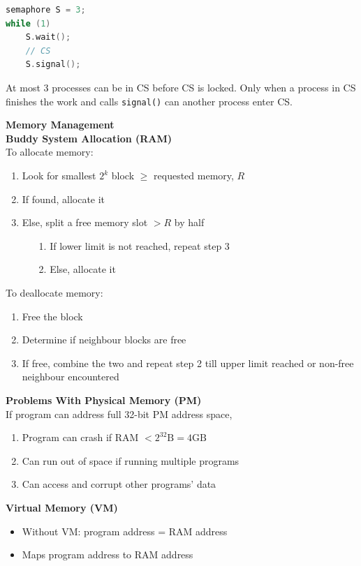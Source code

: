 \documentclass[a4paper, 12pt]{article}
\begin{document}
\begin{multicols*}{4}
\setlength{\columnsep}{-1.4cm}
\begin{multicols}{2}
\noindent
\begin{lstlisting}[language=C]
semaphore S = 3;
while (1)
    S.wait();
    // CS
    S.signal();
\end{lstlisting}
\vfill\null
\columnbreak
At most 3 processes can be in CS before CS is locked. Only when a process in CS finishes the work and calls \texttt{signal()} can another process enter CS.
\end{multicols}

{\small\textbf{Memory Management}} \\
\textbf{Buddy System Allocation (RAM)}\\
To allocate memory:
\begin{enumerate}
	\item Look for smallest $2^k$ block $\geq$ requested memory, $R$
	\item If found, allocate it
	\item Else, split a free memory slot $> R$ by half
	\begin{enumerate}
		\item[1.] If lower limit is not reached, repeat step 3
		\item[2.] Else, allocate it
	\end{enumerate}
\end{enumerate}
To deallocate memory:
\begin{enumerate}
	\item Free the block
	\item Determine if neighbour blocks are free
	\item If free, combine the two and repeat step 2 till upper limit reached or non-free neighbour encountered
\end{enumerate}
\textbf{Problems With Physical Memory (PM)} \\
If program can address full 32-bit PM address space,
\begin{enumerate}
	\item Program can crash if RAM $< 2^{32}\text{B} = 4\text{GB}$
	\item Can run out of space if running multiple programs
	\item Can access and corrupt other programs' data
\end{enumerate}
\textbf{Virtual Memory (VM)}
\begin{itemize}
	\item Without VM: program address = RAM address
	\item Maps program address to RAM address

\end{itemize}
\end{multicols*}
\end{document}
